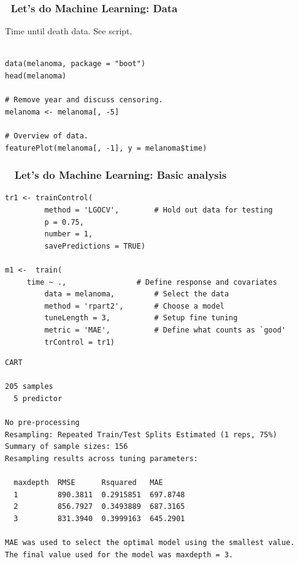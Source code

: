\documentclass[handout, aspectratio = 169]{beamer}
\begin{document}
\begin{frame}[fragile]
\frametitle{\insertframenumber~Let's do Machine Learning: Data}
Time until death data. See script.
\begin{Verbatim}

data(melanoma, package = "boot")
head(melanoma)

# Remove year and discuss censoring.
melanoma <- melanoma[, -5]

# Overview of data.
featurePlot(melanoma[, -1], y = melanoma$time)

\end{Verbatim}

\end{frame} 




\begin{frame}[fragile]
\frametitle{\insertframenumber~ Let's do Machine Learning: Basic analysis}

\vspace{2mm}
\begin{Verbatim}
tr1 <- trainControl(
         method = 'LGOCV',        # Hold out data for testing
         p = 0.75,
         number = 1,
         savePredictions = TRUE)

m1 <-  train(
	 time ~ .,                # Define response and covariates
         data = melanoma,         # Select the data
         method = 'rpart2',       # Choose a model
         tuneLength = 3,          # Setup fine tuning
         metric = 'MAE',          # Define what counts as `good'
         trControl = tr1)

\end{Verbatim}

\end{frame} 






\begin{frame}[fragile]

\small
\begin{Verbatim}
CART 

205 samples
  5 predictor

No pre-processing
Resampling: Repeated Train/Test Splits Estimated (1 reps, 75%) 
Summary of sample sizes: 156 
Resampling results across tuning parameters:

  maxdepth  RMSE      Rsquared   MAE     
  1         890.3811  0.2915851  697.8748
  2         856.7927  0.3493889  687.3165
  3         831.3940  0.3999163  645.2901

MAE was used to select the optimal model using the smallest value.
The final value used for the model was maxdepth = 3.

\end{Verbatim}

\end{frame} 
\end{document}
